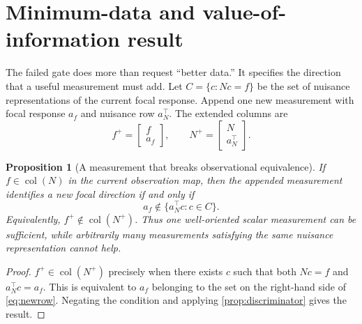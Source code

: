 \documentclass[11pt]{article}
\newtheorem{proposition}{Proposition}
\newcommand{\col}{\operatorname{col}}
\begin{document}


\section{Minimum-data and value-of-information result}
\label{sec:min-data}

The failed gate does more than request ``better data.'' It specifies the direction
that a useful measurement must add. Let $C=\{c:Nc=f\}$ be the set of nuisance
representations of the current focal response. Append one new measurement with
focal response $a_f$ and nuisance row $a_N^{\top}$. The extended columns are
\[
  f^+=\begin{bmatrix}f\\a_f\end{bmatrix},\qquad
  N^+=\begin{bmatrix}N\\a_N^{\top}\end{bmatrix}.
\]

\begin{proposition}[A measurement that breaks observational equivalence]
\label{prop:newmeasurement}
If $f\in\col(N)$ in the current observation map, then the appended measurement
identifies a new focal direction if and only if
\begin{equation}
  a_f\notin\{a_N^{\top}c:c\in C\}.
  \label{eq:newrow}
\end{equation}
Equivalently, $f^+\notin\col(N^+)$. Thus one well-oriented scalar measurement can
be sufficient, while arbitrarily many measurements satisfying the same nuisance
representation cannot help.
\end{proposition}

\begin{proof}
$f^+\in\col(N^+)$ precisely when there exists $c$ such that both $Nc=f$ and
$a_N^{\top}c=a_f$. This is equivalent to $a_f$ belonging to the set on the
right-hand side of \cref{eq:newrow}. Negating the condition and applying
\cref{prop:discriminator} gives the result.
\end{proof}
\end{document}
